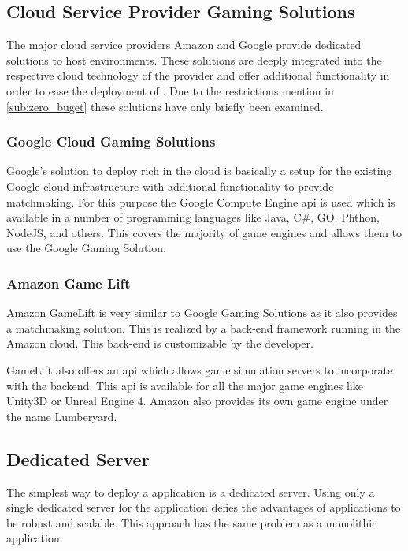 \subsection{Cloud Service Provider Gaming Solutions}

The major cloud service providers Amazon and Google provide dedicated solutions
to host \og{} environments. These solutions are deeply integrated into the
respective cloud technology of the provider and offer additional functionality
in order to ease the deployment of \ogs{}. Due to the restrictions mention in
\autoref{sub:zero_buget} these solutions have only briefly been examined.

\subsubsection{Google Cloud Gaming Solutions}

Google's solution to deploy rich \ogs{} in the cloud is basically a setup
for the existing Google cloud infrastructure with additional functionality to
provide matchmaking. For this purpose the Google Compute Engine \gls{api} is used
which is available in a number of programming languages like Java, C\#, GO,
Phthon, NodeJS, and others. This covers the majority of game engines and
allows them to use the Google Gaming Solution.

\subsubsection{Amazon Game Lift}

Amazon GameLift is very similar to Google Gaming Solutions as it also provides
a matchmaking solution. This is realized by a back-end framework running in the
Amazon cloud. This back-end is customizable by the developer. 

GameLift also offers an \gls{api} which allows game simulation servers to
incorporate with the backend. This \gls{api} is available for all the major game
engines like Unity3D or Unreal Engine 4. Amazon also provides its own game
engine under the name Lumberyard.

\subsection{Dedicated Server}

The simplest way to deploy a \ms{} application is a dedicated server. Using only
a single dedicated server for the application defies the advantages of \ms{}
applications to be robust and scalable. This approach has the same problem as a
monolithic application.

